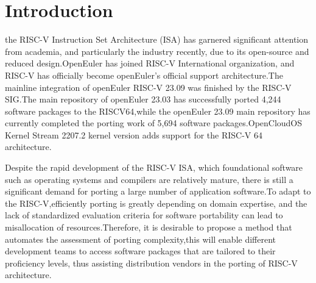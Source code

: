 \documentclass[sigconf,screen,review,anonymous]{acmart}
\begin{document}





\maketitle

\section{Introduction}
the RISC-V Instruction Set Architecture (ISA) has garnered significant attention from academia, and particularly the industry recently, due to its open-source and reduced design\citep{2014The}.OpenEuler has joined RISC-V International organization, and RISC-V has officially become openEuler's official support architecture.The mainline integration of openEuler RISC-V 23.09 was finished by the RISC-V SIG.The main repository of openEuler 23.03 has successfully ported 4,244 software packages to the RISCV64,while the openEuler 23.09 main repository has currently completed the porting work of 5,694 software packages\citep{osti_1560132}.OpenCloudOS Kernel Stream 2207.2 kernel version adds support for the RISC-V 64 architecture\citep{osti_1560133}.  

Despite the rapid development of the RISC-V ISA, which foundational software such as operating systems and compilers are relatively mature, there is still a significant demand for porting a large number of application software\citep{2019Notary}.To adapt to the RISC-V,efficiently porting is greatly depending on domain expertise, and the lack of standardized evaluation criteria for software portability can lead to misallocation of resources.Therefore, it is desirable to propose a method that automates the assessment of porting complexity,this will enable different development teams to access software packages that are tailored to their proficiency levels, thus assisting distribution vendors in the porting of RISC-V architecture.  
\end{document}
